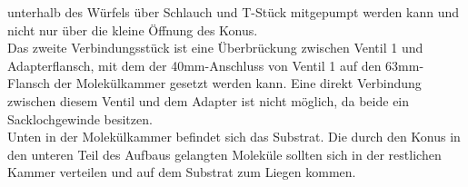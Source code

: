 unterhalb des Würfels über Schlauch und T-Stück mitgepumpt werden kann und nicht nur über die kleine Öffnung
des Konus.\\
Das zweite Verbindungsstück ist eine Überbrückung zwischen Ventil 1 und Adapterflansch, mit dem
der 40mm-Anschluss von Ventil 1 %
auf den 63mm-Flansch der Molekülkammer gesetzt werden kann. Eine direkt Verbindung zwischen diesem
Ventil und dem Adapter ist nicht möglich, da beide ein Sacklochgewinde besitzen.\\
Unten in der Molekülkammer befindet sich das Substrat. Die durch den Konus in den unteren Teil des Aufbaus
gelangten Moleküle sollten sich in der restlichen Kammer verteilen und auf dem Substrat zum Liegen kommen.

\FloatBarrier

